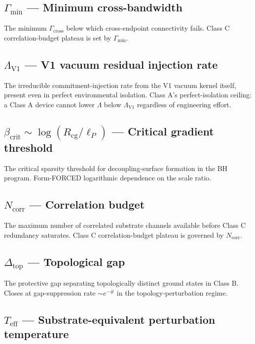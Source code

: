 \documentclass[11pt]{book}
\begin{document}
\subsection{$\Gamma_\mathrm{min}$ — Minimum cross-bandwidth}

The minimum $\Gamma_\mathrm{cross}$ below which cross-endpoint connectivity fails. Class C correlation-budget plateau is set by $\Gamma_\mathrm{min}$.

\subsection{$\Lambda_\mathrm{V1}$ — V1 vacuum residual injection rate}

The irreducible commitment-injection rate from the V1 vacuum kernel itself, present even in perfect environmental isolation. Class A's perfect-isolation ceiling: a Class A device cannot lower $\Lambda$ below $\Lambda_\mathrm{V1}$ regardless of engineering effort.

\subsection{$\beta_\mathrm{crit} \sim \log(R_\mathrm{cg}/\ell_P)$ — Critical gradient threshold}

The critical sparsity threshold for decoupling-surface formation in the BH program. Form-FORCED logarithmic dependence on the scale ratio.

\subsection{$N_\mathrm{corr}$ — Correlation budget}

The maximum number of correlated substrate channels available before Class C redundancy saturates. Class C correlation-budget plateau is governed by $N_\mathrm{corr}$.

\subsection{$\Delta_\mathrm{top}$ — Topological gap}

The protective gap separating topologically distinct ground states in Class B. Closes at gap-suppression rate $\sim e^{-\#}$ in the topology-perturbation regime.

\subsection{$T_\mathrm{eff}$ — Substrate-equivalent perturbation temperature}
\end{document}
